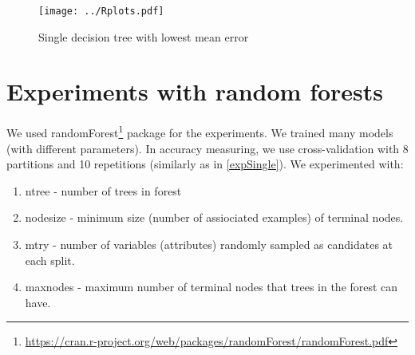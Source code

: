 \documentclass[a4paper]{article}
\begin{document}
\begin{figure}[!hbt]
    \centering
    \texttt{[image: ../Rplots.pdf]}
    \label{fig:single}
    \caption[]{Single decision tree with lowest mean error}
\end{figure}

% 
% 
% 
\section{Experiments with random forests}
\label{forest}
We used randomForest\footnote{\url{https://cran.r-project.org/web/packages/randomForest/randomForest.pdf}} package for the experiments.
We trained many models (with different parameters).
In accuracy measuring, we use cross-validation with 8 partitions
and 10 repetitions (similarly as in \ref{expSingle}).
We experimented with:
\begin{enumerate}
    \item ntree - number of trees in forest
    \item nodesize - minimum size (number of assiociated examples) of terminal nodes.
    \item mtry - number of variables (attributes) randomly sampled as candidates at each split.
    \item maxnodes - maximum number of terminal nodes that trees in the forest can have.
\end{enumerate}
\end{document}
